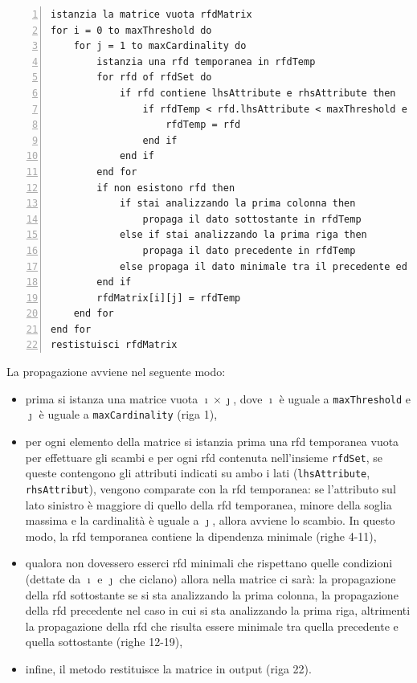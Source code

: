 \begin{lstlisting}[basicstyle=\footnotesize, numbers=left, xleftmargin=3em, captionpos=b, caption={Pseudocodice del metodo per la propagazione dei dati.}, label=retrieveData_pseudo, frame=lines, breaklines=true, morekeywords={if, then, else, end, to, do, for, of}]
istanzia la matrice vuota rfdMatrix
for i = 0 to maxThreshold do
    for j = 1 to maxCardinality do
        istanzia una rfd temporanea in rfdTemp
        for rfd of rfdSet do
            if rfd contiene lhsAttribute e rhsAttribute then
                if rfdTemp < rfd.lhsAttribute < maxThreshold e rfd.cardinality = j then
                    rfdTemp = rfd
                end if
            end if
        end for
        if non esistono rfd then
            if stai analizzando la prima colonna then
                propaga il dato sottostante in rfdTemp
            else if stai analizzando la prima riga then
                propaga il dato precedente in rfdTemp
            else propaga il dato minimale tra il precedente ed il sottostante in rfdTemp
        end if
        rfdMatrix[i][j] = rfdTemp
    end for
end for
restistuisci rfdMatrix
\end{lstlisting}
La propagazione avviene nel seguente modo:
\begin{itemize}
    \item prima si istanza una matrice vuota $\imath \times \jmath$, dove $\imath$ \`{e} uguale a \texttt{maxThreshold} e $\jmath$ \`{e} uguale a \texttt{maxCardinality} (riga 1),
    \item per ogni elemento della matrice si istanzia prima una \acrshort{rfd} temporanea vuota per effettuare gli scambi e per ogni \acrshort{rfd} contenuta nell'insieme \texttt{rfdSet}, se queste contengono gli attributi indicati su ambo i lati (\texttt{lhsAttribute}, \texttt{rhsAttribut}), vengono comparate con la \acrshort{rfd} temporanea: se l'attributo sul lato sinistro \`{e} maggiore di quello della \acrshort{rfd} temporanea, minore della soglia massima e la cardinalit\`{a} \`{e} uguale a $\jmath$, allora avviene lo scambio. In questo modo, la \acrshort{rfd} temporanea contiene la dipendenza minimale (righe 4-11),
    \item qualora non dovessero esserci \acrshort{rfd} minimali che rispettano quelle condizioni (dettate da $\imath$ e $\jmath$ che ciclano) allora nella matrice ci sar\`{a}: la propagazione della \acrshort{rfd} sottostante se si sta analizzando la prima colonna, la propagazione della \acrshort{rfd} precedente nel caso in cui si sta analizzando la prima riga, altrimenti la propagazione della \acrshort{rfd} che risulta essere minimale tra quella precedente e quella sottostante (righe 12-19),
    \item infine, il metodo restituisce la matrice in output (riga 22).
\end{itemize}\par
